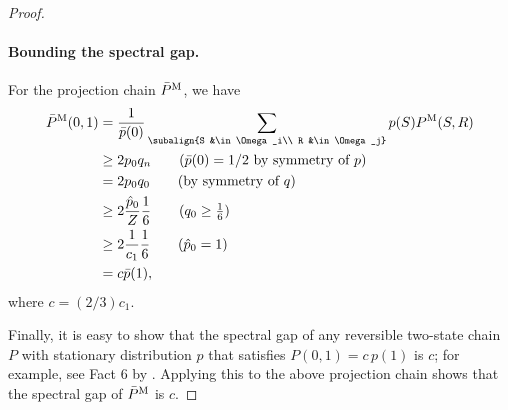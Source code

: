 \begin{proof}
\paragraph{Bounding the spectral gap.}
For the projection chain $\bar{P}^{\mathrm{M}}$, we have
\begin{align*}
\bPm(0, 1) &= \frac{1}{\bar{p}(0)} \sum_{\subalign{S &\in \Omega_i\\ R &\in \Omega_j}} p(S) \Pm(S, R)\\
           &\geq 2p_0 q_n \tag{$\bar{p}(0) = 1/2$ by symmetry of $p$}\\
           &= 2p_0 q_0 \tag{by symmetry of $q$}\\
           &\geq 2\frac{\hat{p}_0}{Z} \frac{1}{6} \tag{$q_0 \geq \frac{1}{6}$}\\
           &\geq 2\frac{1}{c_1}\frac{1}{6} \tag{$\hat{p}_0 = 1$}\\
           &= c \bar{p}(1),
\end{align*}
where $c = (2/3)c_1$.

Finally, it is easy to show that the spectral gap of any reversible two-state chain $P$ with stationary distribution $p$ that satisfies $P(0, 1) = c\,p(1)$ is $c$; for example, see Fact 6 by \cite{anari16}.
Applying this to the above projection chain shows that the spectral gap of $\bar{P}^{\mathrm{M}}$ is $c$.
\end{proof}

